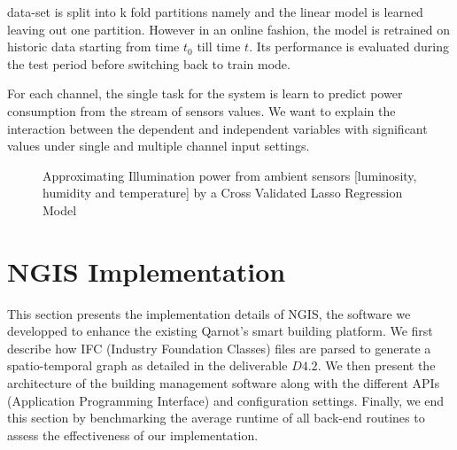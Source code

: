 data-set is split into k fold partitions namely and the linear model is learned leaving out one partition. 
However in an online fashion, the model is retrained on historic data starting from time $t_0$ till time $t$.
Its performance is evaluated during the test period before switching back to train mode. 


For each channel, the single task for the system is learn to predict power consumption from the stream of sensors values. 
We want to explain the interaction between the dependent and independent variables with significant values under single and multiple channel input settings.

\begin{figure}%
    \centering
    \qquad
    \caption{Approximating Illumination power from ambient sensors [luminosity, humidity and temperature] by a Cross Validated Lasso Regression Model  }%
    \label{fig:ambient2lightpower}%
\end{figure}



\section{NGIS Implementation}
\label{implem}
This section presents the implementation details of NGIS, the software we developped to enhance the existing Qarnot's smart building platform.
We first describe how IFC (Industry Foundation Classes) files are parsed to generate a spatio-temporal graph as detailed in the deliverable $D4.2$. We then present the architecture of the building management software along with the different APIs (Application Programming Interface) and configuration settings. Finally, we end this section by benchmarking the average runtime of all back-end routines to assess the effectiveness of our implementation.

